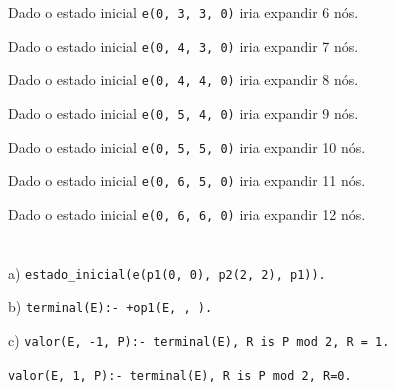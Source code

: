\documentclass[11pt]{article}
\begin{document}
\hspace{0,45cm}Dado o estado inicial \verb|e(0, 3, 3, 0)| iria expandir 6 nós.

\hspace{0,45cm}Dado o estado inicial \verb|e(0, 4, 3, 0)| iria expandir 7 nós.

\hspace{0,45cm}Dado o estado inicial \verb|e(0, 4, 4, 0)| iria expandir 8 nós.

\hspace{0,45cm}Dado o estado inicial \verb|e(0, 5, 4, 0)| iria expandir 9 nós.

\hspace{0,45cm}Dado o estado inicial \verb|e(0, 5, 5, 0)| iria expandir 10 nós.

\hspace{0,45cm}Dado o estado inicial \verb|e(0, 6, 5, 0)| iria expandir 11 nós.

\hspace{0,45cm}Dado o estado inicial \verb|e(0, 6, 6, 0)| iria expandir 12 nós.

\section{}

\hspace{0,6cm}a) \verb|estado_inicial(e(p1(0, 0), p2(2, 2), p1)).|

b) \verb|terminal(E):- +op1(E, , ).|

c) \verb|valor(E, -1, P):- terminal(E), R is P mod 2, R = 1.|

\hspace{0,45cm}\verb|valor(E, 1, P):- terminal(E), R is P mod 2, R=0.|


\end{document}
